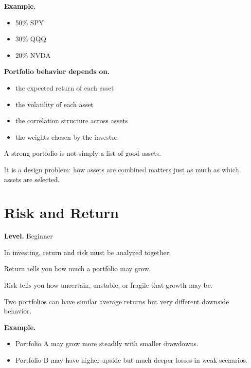 \documentclass[11pt]{report}
\begin{document}
\begin{callout}
\textbf{Example.}

\begin{itemize}
\item 50\% SPY
\item 30\% QQQ
\item 20\% NVDA
\end{itemize}
\end{callout}

\textbf{Portfolio behavior depends on.}

\begin{itemize}
\item the expected return of each asset
\item the volatility of each asset
\item the correlation structure across assets
\item the weights chosen by the investor
\end{itemize}

A strong portfolio is not simply a list of good assets.

It is a design problem: how assets are combined matters just as much as which assets are selected.

\section{Risk and Return}
\begin{callout}
\textbf{Level.} Beginner
\end{callout}

In investing, return and risk must be analyzed together.

Return tells you how much a portfolio may grow.

Risk tells you how uncertain, unstable, or fragile that growth may be.

Two portfolios can have similar average returns but very different downside behavior.

\begin{callout}
\textbf{Example.}

\begin{itemize}
\item Portfolio A may grow more steadily with smaller drawdowns.
\item Portfolio B may have higher upside but much deeper losses in weak scenarios.
\end{itemize}
\end{callout}
\end{document}
